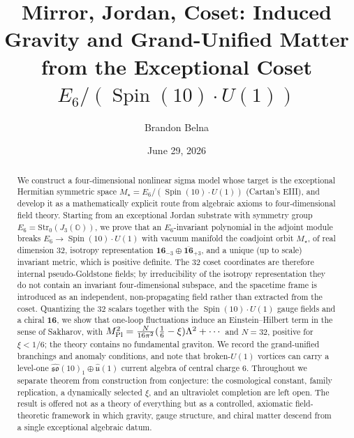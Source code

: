 \documentclass[aps,prd,preprint,longbibliography,nofootinbib,superscriptaddress,floatfix]{revtex4-2}
\newcommand{\Spin}{\operatorname{Spin}}
\begin{document}

\title{Mirror, Jordan, Coset: Induced Gravity and Grand-Unified Matter\\ from the Exceptional Coset \(E_6/(\Spin(10)\cdot U(1))\)}

\author{Brandon Belna}

\date{June 29, 2026}

\begin{abstract}
We construct a four-dimensional nonlinear sigma model whose target is the
exceptional Hermitian symmetric space
\(M_\star=E_6/(\Spin(10)\cdot U(1))\) (Cartan's EIII), and develop it as a
mathematically explicit route from algebraic axioms to four-dimensional field
theory. Starting from an exceptional Jordan substrate with symmetry group
\(E_6=\mathrm{Str}_0(J_3(\mathbb O))\), we prove that an \(E_6\)-invariant
polynomial in the adjoint module breaks \(E_6\to\Spin(10)\cdot U(1)\) with
vacuum manifold the coadjoint orbit \(M_\star\), of real dimension \(32\),
isotropy representation \(\mathbf{16}_{-3}\oplus\overline{\mathbf{16}}_{+3}\),
and a unique (up to scale) invariant metric, which is positive definite. The
\(32\) coset coordinates are therefore internal pseudo-Goldstone fields; by
irreducibility of the isotropy representation they do not contain an invariant
four-dimensional subspace, and the spacetime frame is introduced as an
independent, non-propagating field rather than extracted from the coset.
Quantizing the \(32\) scalars together with the \(\Spin(10)\cdot U(1)\) gauge
fields and a chiral \(\mathbf{16}\), we show that one-loop fluctuations induce
an Einstein--Hilbert term in the sense of Sakharov, with
\(M_{\rm Pl}^2=\frac{N}{16\pi^2}(\tfrac16-\xi)\Lambda^2+\cdots\) and \(N=32\),
positive for \(\xi<1/6\); the theory contains no fundamental graviton. We
record the grand-unified branchings and anomaly conditions, and note that
broken-\(U(1)\) vortices can carry a level-one
\(\widehat{\mathfrak{so}}(10)_1\oplus\widehat{\mathfrak u}(1)\) current algebra
of central charge \(6\). Throughout we separate theorem from construction from
conjecture: the cosmological constant, family replication, a dynamically
selected \(\xi\), and an ultraviolet completion are left open. The result is
offered not as a theory of everything but as a controlled, axiomatic
field-theoretic framework in which gravity, gauge structure, and chiral matter
descend from a single exceptional algebraic datum.
\end{abstract}
\end{document}
